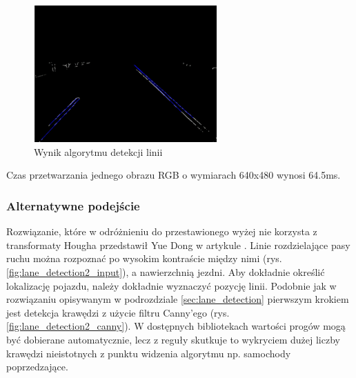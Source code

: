 \begin{figure}
  \centering
  \includegraphics[width=7cm]{img/prehough.png}
  \caption{Wynik algorytmu detekcji linii\cite{T3}}
  \label{fig:result}
\end{figure}

Czas przetwarzania jednego obrazu RGB o wymiarach 640x480 wynosi 64.5ms.

\subsubsection{Alternatywne podejście}
Rozwiązanie, które w odróżnieniu do przestawionego wyżej nie korzysta z transformaty Hougha przedstawił Yue Dong w artykule \cite{T6}.
Linie rozdzielające pasy ruchu można rozpoznać po wysokim kontraście między nimi (rys. \ref{fig:lane_detection2_input}), a nawierzchnią jezdni. Aby dokładnie określić lokalizację pojazdu, należy dokładnie wyznaczyć pozycję linii. 
Podobnie jak w rozwiązaniu opisywanym w podrozdziale \ref{sec:lane_detection} pierwszym krokiem jest detekcja krawędzi z użycie filtru Canny'ego (rys. \ref{fig:lane_detection2_canny}). W dostępnych bibliotekach wartości progów mogą być dobierane automatycznie, lecz z reguły skutkuje to wykryciem dużej liczby krawędzi nieistotnych z punktu widzenia algorytmu np. samochody poprzedzające.

